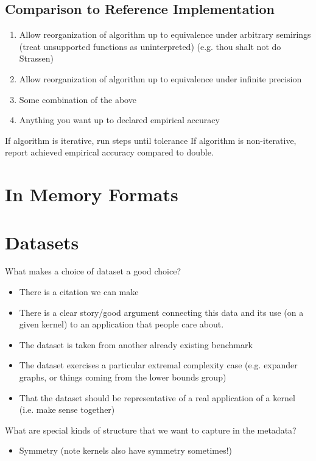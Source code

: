 \documentclass{article}
\begin{document}
\subsection{Comparison to Reference Implementation}
\begin{enumerate}
    \item Allow reorganization of algorithm up to equivalence under arbitrary semirings (treat unsupported functions as uninterpreted) (e.g. thou shalt not do Strassen)
    \item Allow reorganization of algorithm up to equivalence under infinite precision
    \item Some combination of the above
    \item Anything you want up to declared empirical accuracy
\end{enumerate}

If algorithm is iterative, run steps until tolerance
If algorithm is non-iterative, report achieved empirical accuracy compared to double.

\section{In Memory Formats}


\section{Datasets}

What makes a choice of dataset a good choice?
\begin{itemize}
    \item There is a citation we can make
    \item There is a clear story/good argument connecting this data and its use (on a given kernel) to an application that people care about.
    \item The dataset is taken from another already existing benchmark
    \item The dataset exercises a particular extremal complexity case (e.g. expander graphs, or things coming from the lower bounds group)
    \item That the dataset should be representative of a real application of a  kernel (i.e. make sense together)
\end{itemize}

What are special kinds of structure that we want to capture in the metadata?
\begin{itemize}
    \item Symmetry (note kernels also have symmetry sometimes!)
\end{itemize}
\end{document}
